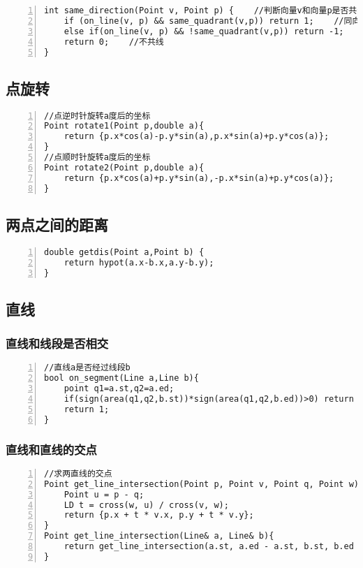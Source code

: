 \begin{lstlisting}[language={[ANSI]C},numbers=left]
int same_direction(Point v, Point p) {    //判断向量v和向量p是否共线且同向
	if (on_line(v, p) && same_quadrant(v,p)) return 1;    //同向
	else if(on_line(v, p) && !same_quadrant(v,p)) return -1;    //反向
	return 0;    //不共线
}
\end{lstlisting}

\subsection{点旋转}

\begin{lstlisting}[language={[ANSI]C},numbers=left]
//点逆时针旋转a度后的坐标
Point rotate1(Point p,double a){
	return {p.x*cos(a)-p.y*sin(a),p.x*sin(a)+p.y*cos(a)};
}
//点顺时针旋转a度后的坐标
Point rotate2(Point p,double a){
	return {p.x*cos(a)+p.y*sin(a),-p.x*sin(a)+p.y*cos(a)};
}
\end{lstlisting}

\subsection{两点之间的距离}

\begin{lstlisting}[language={[ANSI]C},numbers=left]
double getdis(Point a,Point b) {
	return hypot(a.x-b.x,a.y-b.y);
}
\end{lstlisting}

\subsection{直线}
\subsubsection{直线和线段是否相交}
\begin{lstlisting}[language={[ANSI]C},numbers=left]
//直线a是否经过线段b 
bool on_segment(Line a,Line b){
	point q1=a.st,q2=a.ed;
	if(sign(area(q1,q2,b.st))*sign(area(q1,q2,b.ed))>0) return 0;
	return 1;
}
\end{lstlisting}
\subsubsection{直线和直线的交点}

\begin{lstlisting}[language={[ANSI]C},numbers=left]
//求两直线的交点
Point get_line_intersection(Point p, Point v, Point q, Point w){
    Point u = p - q;
    LD t = cross(w, u) / cross(v, w);
    return {p.x + t * v.x, p.y + t * v.y};
}
Point get_line_intersection(Line& a, Line& b){
    return get_line_intersection(a.st, a.ed - a.st, b.st, b.ed - b.st);
}
\end{lstlisting}

